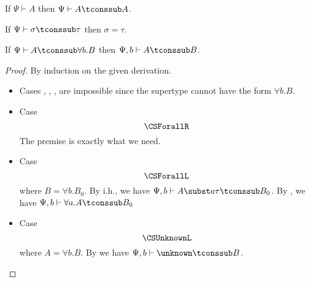 
\begin{clemma} \label{lemma:sub_refl}%
  If $\Psi \vdash A$ then $\Psi \vdash A \tconssub A$.
\end{clemma}


\begin{clemma} If $\Psi \vdash \sigma \tconssub \tau$ then $\sigma = \tau$.
  \label{lemma:mono_equal}
\end{clemma}


\begin{mlemma}[Invertibility]
  If $\Psi \vdash A \tconssub \forall b. B$ then $\Psi, b \vdash A \tconssub B$.
  \label{lemma:forall_invert}
\end{mlemma}
\begin{proof}
  By induction on the given derivation.
  \begin{itemize}
  \item Cases , , ,  are
    impossible since the supertype cannot have the form $\forall b. B$.
  \item Case \[\CSForallR\] The premise is exactly what we need.
  \item Case \[\CSForallL\] where $B = \forall b. B_0$. By i.h., we have $\Psi,
    b \vdash A \subst a \tau \tconssub B_0$. By , we have $\Psi,
    b \vdash \forall a. A \tconssub B_0$
  \item Case \[\CSUnknownL\] where $A = \forall b. B$. By  we
    have $\Psi, b \vdash \unknown \tconssub B$.
  \end{itemize}
\end{proof}


